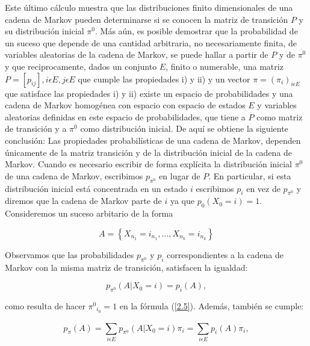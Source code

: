 		Este \'{u}ltimo c\'{a}lculo muestra que las distribuciones finito dimensionales de una cadena de Markov pueden determinarse si se conocen la matriz de transici\'{o}n $P$ y su distribuci\'{o}n inicial $\pi^{0}$. M\'{a}s a\'{u}n, es posible demostrar que la probabilidad de un suceso que depende de una cantidad arbitraria, no necesariamente finita, de variables aleatorias de la cadena de Markov, se puede hallar a partir de $P$ y de $\pi^{0}$ y que reciprocamente, dados un conjunto $E$, finito o numerable, una matriz $P=[ p _{ ij }], i\epsilon E,j\epsilon E$ que cumple las propiedades i) y ii) y un vector $\pi =({ \pi  }_{ i })_{i\epsilon E}$ que satisface las propiedades i) y ii) existe un espacio de probabilidades y una cadena de Markov homog\'{e}nea con espacio con espacio de estados $E$ y variables aleatorias definidas en este espacio de probabilidades, que tiene a $P$ como matriz de transici\'{o}n y a $\pi^{0}$ como distribuci\'{o}n inicial. De aqu\'{i} se obtiene la siguiente conclusi\'{o}n: Las propiedades probabil\'{i}sticas de una cadena de Markov, dependen \'{u}nicamente de la matriz transici\'{o}n y de la distribuci\'{o}n inicial de la cadena de Markov.
		Cuando es necesario escribir de forma expl\'{i}cita la distribuci\'{o}n inicial $\pi^{0}$ de una cadena de Markov, escribimos $p_{ { \pi  }^{ 0 } }$ en lugar de $P$. En particular, si esta distribuci\'{o}n inicial est\'{a} concentrada en un estado $i$ escribimos $p_{ i }$ en vez de $p_{ { \pi  }^{ 0 } }$ y diremos que la cadena de Markov parte de $i$ ya que $p_{ 0 }( X_{ 0 }=i)=1$.
		Consideremos un suceso arbitario de la forma

		\begin{equation}
			A=\left\{  X_{ { n }_{ 1 } }={ i }_{ { n }_{ 1 } },\ldots , X_{ { n }_{ k } }={ i }_{ { n }_{ k } } \right\} \nonumber
		\end{equation}
		
		Observamos que las probabilidades $p_{ { \pi  }^{ 0 } }$ y $p_{ i }$ correspondientes a la cadena de Markov con la misma matriz de transici\'{o}n, satisfacen la igualdad:
		
		\begin{equation}
			p_{ \pi^{0} }(A| X_{ 0 }=i)=p_{ i }(A), \nonumber
		\end{equation}
		
		\noindent
		como resulta de hacer ${ \pi^{0} }_{ { i }_{ 0 } }=1$ en la f\'{o}rmula (\ref{2.5}). Adem\'{a}s, tambi\'{e}n se cumple:
		
		\begin{equation}
			p_{ \pi  }(A)=\sum _{ i\epsilon E}^{  }{ p_{ \pi^{0} } } (A| X_{ 0 }=i){ \pi  }_{ i }=\sum _{ i\epsilon E}^{  }{ p_{ i }(A){ \pi  }_{ i } } ,  \label{2.15}
		\end{equation}
		
